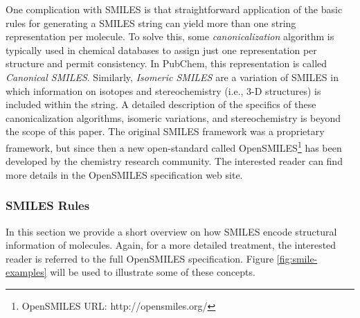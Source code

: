 One complication with SMILES is that straightforward application of the basic rules for generating a SMILES string can yield more than one string representation per molecule. To solve this, some {\em canonicalization} algorithm is typically used in chemical databases to  assign just one representation per structure and permit consistency. In PubChem, this representation is called {\em Canonical SMILES}. Similarly, 
{\em Isomeric SMILES} are a variation of SMILES in which information on isotopes and stereochemistry (i.e., 3-D structures) is included within the string. A detailed description of the specifics of these canonicalization algorithms, isomeric variations, and stereochemistry is beyond the scope of this paper. The original SMILES framework was a proprietary framework, but since then a new open-standard called OpenSMILES\footnote{OpenSMILES URL: http://opensmiles.org/} has been developed by the chemistry research community. The interested reader can find more details in the OpenSMILES specification web site. 
%
    \subsubsection{SMILES Rules \label{rules}}
    In this section we provide a short overview on how SMILES encode structural information of molecules. Again, for a more detailed treatment, the interested reader is referred to the full OpenSMILES specification. Figure \ref{fig:smile-examples} will be used to illustrate some of these concepts.
    
